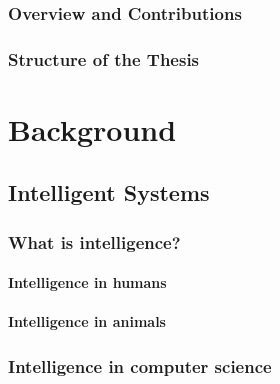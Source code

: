 \documentclass[12pt,a4paper,openright,twoside]{book}
\begin{document}
\section{Overview and Contributions}\label{sec:overview-and-contributions}


\section{Structure of the Thesis}\label{sec:structure-of-the-thesis}





\part{Background}\label{part:background}


\chapter{Intelligent Systems}\label{ch:intelligent-systems}

\section{What is intelligence?}\label{sec:what-is-intelligence}

\subsection{Intelligence in humans}\label{subsec:intelligence-in-humans}

\subsection{Intelligence in animals}\label{subsec:intelligence-in-animals}

\section{Intelligence in computer science}\label{sec:intelligence-in-computer-science}
\end{document}
